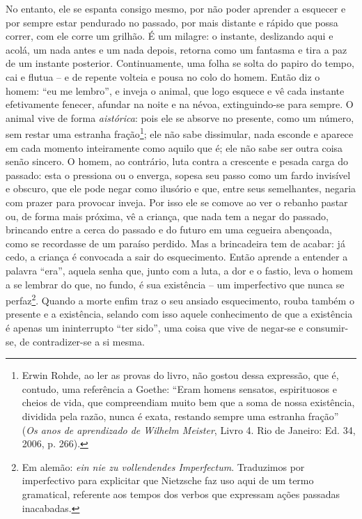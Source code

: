 No entanto, ele se espanta consigo mesmo, por não poder aprender a
esquecer e por sempre estar pendurado no passado, por mais distante e
rápido que possa correr, com ele corre um grilhão. É um milagre: o
instante, deslizando aqui e acolá, um nada antes e um nada depois,
retorna como um fantasma e tira a paz de um instante posterior.
Continuamente, uma folha se solta do papiro do tempo, cai e flutua -- e
de repente volteia e pousa no colo do homem. Então diz o homem: ``eu me
lembro'', e inveja o animal, que logo esquece e vê cada instante
efetivamente fenecer, afundar na noite e na névoa, extinguindo-se para
sempre. O animal vive de forma \emph{aistórica}: pois ele se absorve no
presente, como um número, sem restar uma estranha fração\footnote{Erwin
  Rohde, ao ler as provas do livro, não gostou dessa expressão, que é,
  contudo, uma referência a Goethe: ``Eram homens sensatos, espirituosos
  e cheios de vida, que compreendiam muito bem que a soma de nossa
  existência, dividida pela razão, nunca é exata, restando sempre uma
  estranha fração'' (\emph{Os anos de aprendizado de Wilhelm Meister},
  Livro 4. Rio de Janeiro: Ed. 34, 2006, p. 266).}; ele não sabe
dissimular, nada esconde e aparece em cada momento inteiramente como
aquilo que é; ele não sabe ser outra coisa senão sincero. O homem, ao
contrário, luta contra a crescente e pesada carga do passado: esta o
pressiona ou o enverga, sopesa seu passo como um fardo invisível e
obscuro, que ele pode negar como ilusório e que, entre seus semelhantes,
negaria com prazer para provocar inveja. Por isso ele se comove ao ver
o rebanho pastar ou, de forma mais próxima, vê a criança, que nada tem a
negar do passado, brincando entre a cerca do passado e do futuro em uma
cegueira abençoada, como se recordasse de um paraíso perdido. Mas a
brincadeira tem de acabar: já cedo, a criança é convocada a sair do
esquecimento. Então aprende a entender a palavra ``era'', aquela senha
que, junto com a luta, a dor e o fastio, leva o homem a se lembrar do
que, no fundo, é sua existência -- um imperfectivo que nunca se
perfaz\footnote{Em alemão: \emph{ein nie zu vollendendes Imperfectum}.
  Traduzimos por imperfectivo para explicitar que Nietzsche faz uso aqui
  de um termo gramatical, referente aos tempos dos verbos que expressam
  ações passadas inacabadas.}. Quando a morte enfim traz o seu ansiado
esquecimento, rouba também o presente e a existência, selando com
isso aquele conhecimento de que a existência é apenas um ininterrupto
``ter sido'', uma coisa que vive de negar-se e consumir-se, de
contradizer-se a si mesma.


